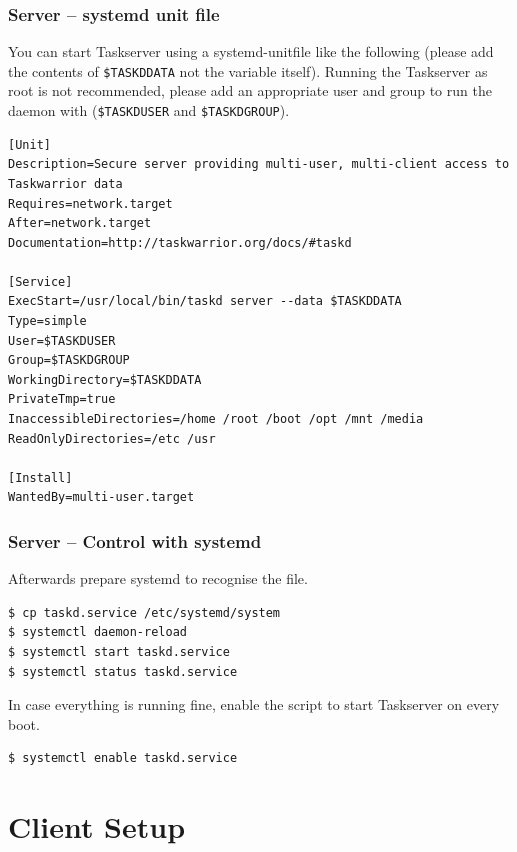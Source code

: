 \documentclass[t,handout]{beamer}
\begin{document}
\begin{frame}[fragile]\frametitle{Server -- systemd unit file}
    You can start Taskserver using a systemd-unitfile like the following (please add the contents of \verb+$TASKDDATA+ not the variable itself). Running the Taskserver as root is not recommended, please add an appropriate user and group to run the daemon with (\verb+$TASKDUSER+ and \verb+$TASKDGROUP+).

    \begin{lstlisting}
[Unit]
Description=Secure server providing multi-user, multi-client access to Taskwarrior data
Requires=network.target
After=network.target
Documentation=http://taskwarrior.org/docs/#taskd

[Service]
ExecStart=/usr/local/bin/taskd server --data $TASKDDATA
Type=simple
User=$TASKDUSER
Group=$TASKDGROUP
WorkingDirectory=$TASKDDATA
PrivateTmp=true
InaccessibleDirectories=/home /root /boot /opt /mnt /media
ReadOnlyDirectories=/etc /usr

[Install]
WantedBy=multi-user.target\end{lstlisting}
\end{frame}

\begin{frame}[fragile]\frametitle{Server -- Control with systemd}
    Afterwards prepare systemd to recognise the file.

    \begin{lstlisting}
$ cp taskd.service /etc/systemd/system
$ systemctl daemon-reload
$ systemctl start taskd.service
$ systemctl status taskd.service\end{lstlisting}

    In case everything is running fine, enable the script to start Taskserver on every boot.

    \begin{lstlisting}
$ systemctl enable taskd.service\end{lstlisting}
\end{frame}

\section{Client Setup}
\end{document}
